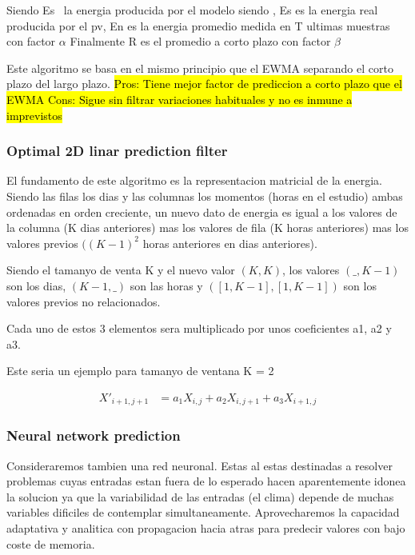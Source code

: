 Siendo Es~ la energia producida por el modelo siendo ,
Es es la energia real producida por el pv,
En es la energia promedio medida en T ultimas muestras con factor $\alpha$
Finalmente R es el promedio a corto plazo con factor $\beta$

Este algoritmo se basa en el mismo principio que el EWMA separando el corto plazo del largo plazo.
\hl{
Pros: Tiene mejor factor de prediccion a corto plazo que el EWMA
Cons: Sigue sin filtrar variaciones habituales y no es inmune a imprevistos
}


\subsubsection{ Optimal 2D linar prediction filter} 
\label{ssub:subsubsection_name}

El fundamento de este algoritmo es la representacion matricial de la energia. Siendo las filas los dias y las columnas los momentos (horas en el estudio) ambas ordenadas en orden creciente, un nuevo dato de energia es igual a los valores de la columna (K dias anteriores) mas los valores de fila (K horas anteriores) mas los valores previos $((K-1)^2$ horas anteriores en dias anteriores).

Siendo el tamanyo de venta K y el nuevo valor $(K,K)$, los valores $(\_,K-1)$ son los dias, $(K-1,\_)$ son las horas y $([1,K-1],[1,K-1])$ son los valores previos no relacionados. 

Cada uno de estos 3 elementos sera multiplicado por unos coeficientes a1, a2 y a3. 

Este seria un ejemplo para tamanyo de ventana K = 2

\begin{align}
	X'_{i+1,j+1} &= a_1 X_{i,j} + a_2 X_{i,j+1} + a_3 X_{i+1,j}
\end{align}


\subsubsection{ Neural network prediction} 
\label{ssub:subsubsection_name}

Consideraremos tambien una red neuronal. Estas al estas destinadas a resolver problemas cuyas entradas estan fuera de lo esperado hacen aparentemente idonea la solucion ya que la variabilidad de las entradas (el clima) depende de muchas variables dificiles de contemplar simultaneamente.
Aprovecharemos la capacidad adaptativa y analitica con propagacion hacia atras para predecir valores con bajo coste de memoria.

